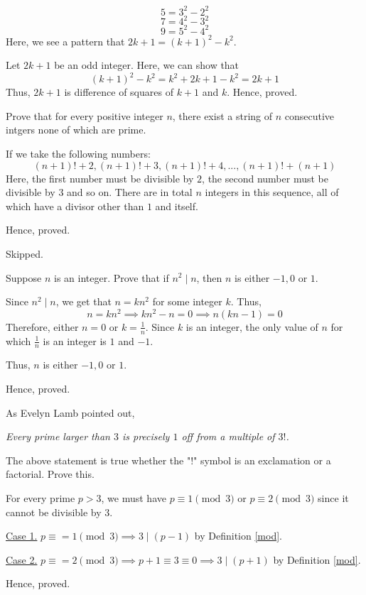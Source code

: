 \begin{scratch}
	$$5 = 3^2 - 2^2$$
	$$7 = 4^2 - 3^2$$
	$$9 = 5^2 - 4^2$$
	Here, we see a pattern that $2k+1 = (k+1)^2 - k^2$.
\end{scratch}

\bs
	Let $2k+1$ be an odd integer. Here, we can show that
	$$(k+1)^2 - k^2 = k^2 + 2k + 1 - k^2 = 2k + 1$$
	Thus, $2k+1$ is difference of squares of $k+1$ and $k$.
	Hence, proved.
\es


\bp 
	Prove that for every positive integer $n$, there exist a string of $n$ consecutive intgers none of which are prime.
\ep 

\bs
	If we take the following numbers:
	$$(n+1)! + 2, (n+1)! + 3, (n+1)! + 4, ..., (n+1)! + (n+1)$$
	Here, the first number must be divisible by $2$, the second number must be divisible by $3$ and so on.
	There are in total $n$ integers in this sequence, all of which have a divisor other than $1$ and itself.

	Hence, proved.
\es

\bp Skipped.\ep 

\bp 
	Suppose $n$ is an integer. Prove that if $n^2 \mid n$, then $n$ is either $-1, 0$ or $1$.
\ep 

\bs
	Since $n^2 \mid n$, we get that $n = kn^2$ for some integer $k$. Thus, 
	$$n = kn^2 \implies kn^2 - n = 0 \implies n(kn-1) = 0$$
	Therefore, either $n = 0$ or $k = \frac{1}{n}$. Since $k$ is an integer, the only value of $n$ for which $\frac{1}{n}$ is an integer is $1$ and $-1$.

	Thus, $n$ is either $-1, 0$ or $1$.

	Hence, proved.
\es

\bp 
	As Evelyn Lamb pointed out,

	\bigbreak
	\emph{Every prime larger than $3$ is precisely $1$ off from a multiple of $3!$.}
	\bigbreak

	The above statement is true whether the "!" symbol is an exclamation or a factorial. Prove this.
\ep 

\bs
	For every prime $p > 3$, we must have $p \equiv 1 \pmod{3}$ or $p \equiv 2 \pmod{3}$ since it cannot be divisible by $3$.

	\underline{Case 1.} $p \equiv = 1 \pmod{3} \implies 3 \mid (p-1)$ by Definition \ref{mod}.

	\underline{Case 2.} $p \equiv = 2 \pmod{3} \implies p+1 \equiv 3 \equiv 0 \implies 3 \mid (p+1)$ by Definition \ref{mod}.

	Hence, proved.
	\bigbreak

